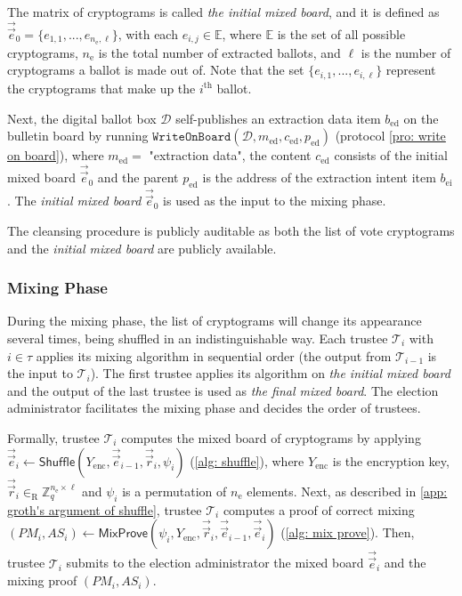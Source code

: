 The matrix of cryptograms is called \textit{the initial mixed board}, and it is defined as $\vec{\vec{e}}_0 = \{ e_{1, 1}, ..., e_{n_\mathrm{e}, \ell} \}$, with each $e_{i, j} \in \mathbb{E}$, where $\mathbb{E}$ is the set of all possible cryptograms, $n_\mathrm{e}$ is the total number of extracted ballots, and $\ell$ is the number of cryptograms a ballot is made out of. Note that the set $\{ e_{i, 1}, ..., e_{i, \ell} \}$ represent the cryptograms that make up the $i^\mathrm{th}$ ballot.

Next, the digital ballot box $\mathcal{D}$ self-publishes an extraction data item $b_\mathrm{ed}$ on the bulletin board by running $\mathtt{WriteOnBoard}(\mathcal{D}, m_\mathrm{ed}, c_\mathrm{ed}, p_\mathrm{ed})$ (protocol \ref{pro: write on board}), where $m_\mathrm{ed} = $ "extraction data", the content $c_\mathrm{ed}$ consists of the initial mixed board $\vec{\vec{e}}_0$ and the parent $p_\mathrm{ed}$ is the address of the extraction intent item $b_\mathrm{ei}$. The \textit{initial mixed board} $\vec{\vec{e}}_0$ is used as the input to the mixing phase.

The cleansing procedure is publicly auditable as both the list of vote cryptograms and the \textit{initial mixed board} are publicly available.


\subsubsection{Mixing Phase} \label{sec: mixing phase}
During the mixing phase, the list of cryptograms will change its appearance several times, being shuffled in an indistinguishable way. Each trustee $\mathcal{T}_i$ with $i \in \tau$ applies its mixing algorithm in sequential order (the output from $\mathcal{T}_{i-1}$ is the input to $\mathcal{T}_i$). The first trustee applies its algorithm on \textit{the initial mixed board} and the output of the last trustee is used as \textit{the final mixed board}. The election administrator facilitates the mixing phase and decides the order of trustees.

Formally, trustee $\mathcal{T}_i$ computes the mixed board of cryptograms by applying $\vec{\vec{e}}_i \gets \mathsf{Shuffle}(Y_\mathrm{enc}, \vec{\vec{e}}_{i-1}, \vec{\vec{r}}_i, \psi_i)$ (\cref{alg: shuffle}), where $Y_\mathrm{enc}$ is the encryption key, $\vec{\vec{r}}_i \in_\mathrm{R} \mathbb{Z}_q^{n_\mathrm{e} \times \ell}$ and $\psi_i$ is a permutation of $n_\mathrm{e}$ elements. Next, as described in \cref{app: groth's argument of shuffle}, trustee $\mathcal{T}_i$ computes a proof of correct mixing $(PM_i, AS_i) \gets \mathsf{MixProve}(\psi_i, Y_\mathrm{enc}, \vec{\vec{r}}_i, \vec{\vec{e}}_{i-1}, \vec{\vec{e}}_i)$ (\cref{alg: mix prove}). Then, trustee $\mathcal{T}_i$ submits to the election administrator the mixed board $\vec{\vec{e}}_i$ and the mixing proof $(PM_i, AS_i)$.

